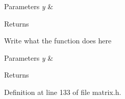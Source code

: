 \begin{DoxyParams}{Parameters}
{\em y} & \\
\hline
\end{DoxyParams}
\begin{DoxyReturn}{Returns}

\end{DoxyReturn}
Write what the function does here


\begin{DoxyParams}{Parameters}
{\em y} & \\
\hline
\end{DoxyParams}
\begin{DoxyReturn}{Returns}

\end{DoxyReturn}


Definition at line 133 of file matrix.\+h.



